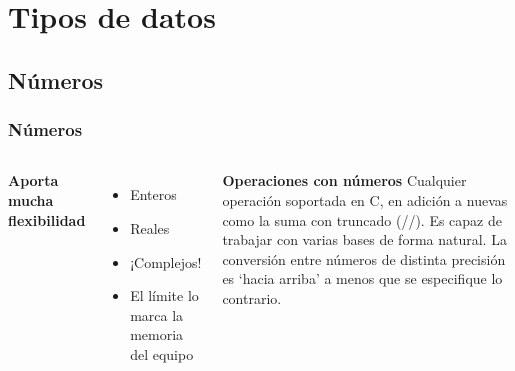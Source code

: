 \documentclass{beamer}
\begin{document}
\section{Tipos de datos}
\subsection{Números}
\begin{frame}
\frametitle{Números}
\begin{columns}[c] %

\textbf{Aporta mucha flexibilidad}
\begin{itemize}
\item Enteros
\item Reales
\item ¡Complejos!
\item El límite lo marca la memoria del equipo
\end{itemize}

\textbf{Operaciones con números}
Cualquier operación soportada en C, en adición a nuevas como la suma con truncado (//). Es capaz de trabajar con varias bases de forma natural. La conversión entre números de distinta precisión es `hacia arriba' a menos que se especifique lo contrario.
\end{columns}
\end{frame}
\end{document}
